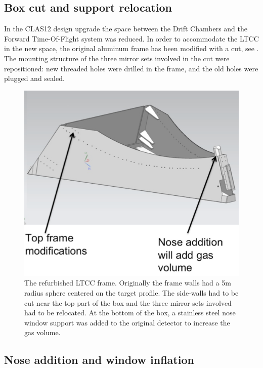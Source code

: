 \subsection{Box cut and support relocation }

In the CLAS12 design upgrade the space between the Drift Chambers and the Forward Time-Of-Flight system was reduced.
In order to accommodate the LTCC in the new space, the original aluminum frame has been modified with a cut, see . The mounting structure
of the three mirror sets involved in the cut were repositioned: new threaded holes were drilled in the frame, and the old holes were plugged and sealed.

\begin{figure}
	\centering
	\includegraphics[width=1.0\columnwidth,keepaspectratio]{img/boxCut.png}
	\caption{The refurbished LTCC frame. Originally the frame walls had a 5m radius sphere centered on the target profile.
            The side-walls had to be cut near the top part of the box and the three mirror sets involved had to be relocated.
				At the bottom of the box, a stainless steel nose window support was added to the original detector to increase the gas volume.}
	\label{fig:boxCut}
\end{figure}


\subsection{Nose addition and window inflation}

